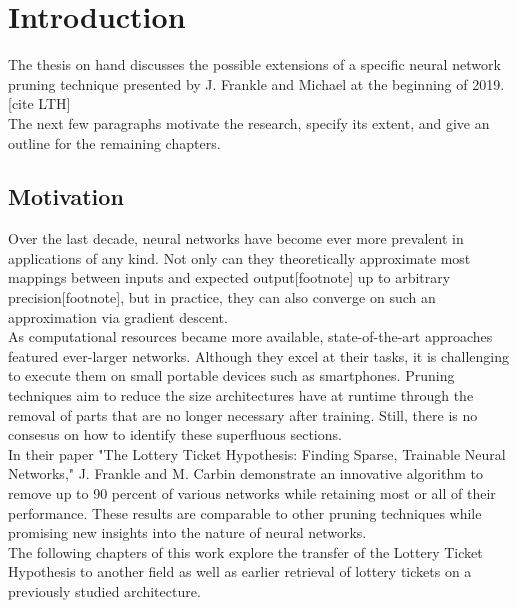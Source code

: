 \chapter{Introduction}
The thesis on hand discusses the possible extensions of a specific neural network pruning technique presented by J. Frankle and Michael at the beginning of 2019. [cite LTH]\\
The next few paragraphs motivate the research,  specify its extent, and give an outline for the remaining chapters.

\section{Motivation}
Over the last decade, neural networks have become ever more prevalent in applications of any kind. Not only can they theoretically approximate most mappings between inputs and expected output[footnote] up to arbitrary precision[footnote], but in practice, they can also converge on such an approximation via gradient descent.\cite{?}\\ 
As computational resources became more available, state-of-the-art approaches featured ever-larger networks. Although they excel at their tasks, it is challenging to execute them on small portable devices such as smartphones. Pruning techniques aim to reduce the size architectures have at runtime through the removal of parts that are no longer necessary after training. Still, there is no consesus on how to identify these superfluous sections.\\
In their paper "The Lottery Ticket Hypothesis: Finding Sparse, Trainable Neural Networks," J. Frankle and M. Carbin demonstrate an innovative algorithm to remove up to 90 percent of various networks while retaining most or all of their performance. These results are comparable to other pruning techniques while promising new insights into the nature of neural networks.\cite{LTH}
\\
The following chapters of this work explore the transfer of the Lottery Ticket Hypothesis to another field as well as earlier retrieval of lottery tickets on a previously studied architecture.

